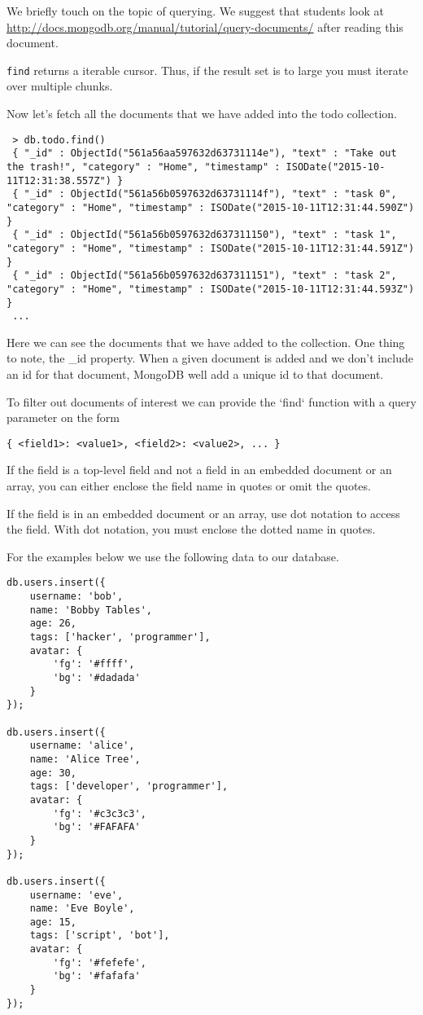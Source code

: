 We briefly touch on the topic of querying. We suggest that students look at \url{http://docs.mongodb.org/manual/tutorial/query-documents/} after reading this document.

\texttt{find} returns a iterable cursor. Thus, if the result set is to large you must iterate over multiple chunks.

Now let's fetch all the documents that we have added into the todo collection.

\begin{lstlisting}
 > db.todo.find()
 { "_id" : ObjectId("561a56aa597632d63731114e"), "text" : "Take out the trash!", "category" : "Home", "timestamp" : ISODate("2015-10-11T12:31:38.557Z") }
 { "_id" : ObjectId("561a56b0597632d63731114f"), "text" : "task 0", "category" : "Home", "timestamp" : ISODate("2015-10-11T12:31:44.590Z") }
 { "_id" : ObjectId("561a56b0597632d637311150"), "text" : "task 1", "category" : "Home", "timestamp" : ISODate("2015-10-11T12:31:44.591Z") }
 { "_id" : ObjectId("561a56b0597632d637311151"), "text" : "task 2", "category" : "Home", "timestamp" : ISODate("2015-10-11T12:31:44.593Z") }
 ...
\end{lstlisting}

Here we can see the documents that we have added to the collection. One thing to note, the \_id property. When a given document is added and we don't include an id for that document, MongoDB well add a unique id to that document.

To filter out documents of interest we can provide the `find` function with a query parameter on the form

\begin{lstlisting}
{ <field1>: <value1>, <field2>: <value2>, ... }
\end{lstlisting}

If the field is a top-level field and not a field in an embedded document or an array, you can either enclose the field name in quotes or omit the quotes.

If the field is in an embedded document or an array, use dot notation to access the field. With dot notation, you must enclose the dotted name in quotes.

For the examples below we use the following data to our database.
\begin{lstlisting}
db.users.insert({
    username: 'bob',
    name: 'Bobby Tables',
    age: 26,
    tags: ['hacker', 'programmer'],
    avatar: {
        'fg': '#ffff',
        'bg': '#dadada'
    }
});

db.users.insert({
    username: 'alice',
    name: 'Alice Tree',
    age: 30,
    tags: ['developer', 'programmer'],
    avatar: {
        'fg': '#c3c3c3',
        'bg': '#FAFAFA'
    }
});

db.users.insert({
    username: 'eve',
    name: 'Eve Boyle',
    age: 15,
    tags: ['script', 'bot'],
    avatar: {
        'fg': '#fefefe',
        'bg': '#fafafa'
    }
});
\end{lstlisting}

